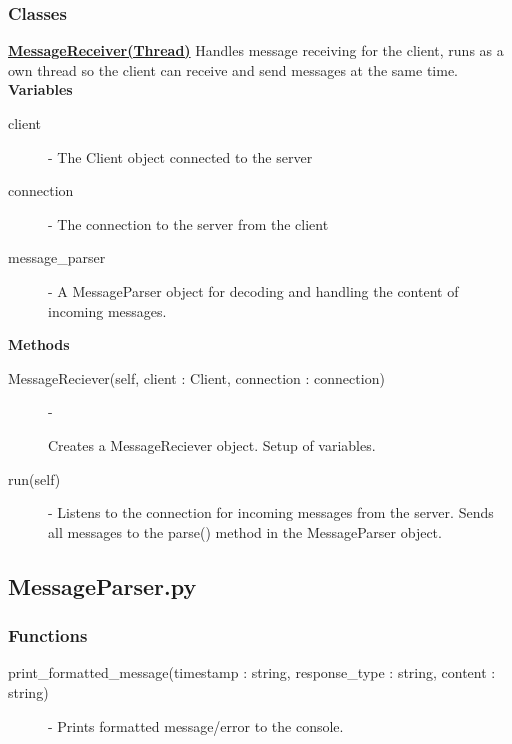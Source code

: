 \documentclass[a4paper, 12pt]{article}
\begin{document}
        \subsubsection{Classes}
            \textbf{\underline{MessageReceiver(Thread)}}
            \newline
            \newline
                Handles message receiving for the client, runs as a own thread so the client can receive and send messages at the same time.
                \newline
                \newline
                \textbf{Variables}
                    \begin{description}
                            \item[client] - The Client object connected to the server
                            \item[connection] - The connection to the server from the client
                            \item[message\_parser] - A MessageParser object for decoding and handling the content of incoming messages.
                    \end{description}
                \textbf{Methods}
                    \begin{description}
                            \item[MessageReciever(self, client : Client, connection : connection)] -

                            Creates a MessageReciever object. Setup of variables.
                            \item[run(self)] - Listens to the connection for incoming messages from the server. Sends all messages to the parse() method in the MessageParser object.
                    \end{description}
    \subsection{MessageParser.py}
        \subsubsection{Functions}
            \begin{description}
                \item[\small{print\_formatted\_message(timestamp : string, response\_type : string, content : string)}] - Prints formatted message/error to the console.
            \end{description}
\end{document}
